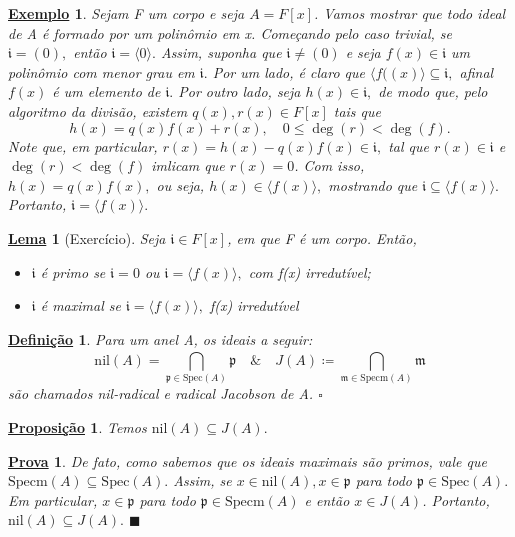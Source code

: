 \documentclass{article}
\newtheorem*{def*}{\underline{Defini\c c\~ao}}
\newtheorem*{lemma*}{\underline{Lema}}
\newtheorem*{prop*}{\underline{Proposi\c c\~ao}}
\newtheorem{example}{\underline{Exemplo}}
\newtheorem*{proof*}{\underline{Prova}}
\renewcommand\qedsymbol{$\blacksquare$}
\begin{document}
\begin{example}
  Sejam F um corpo e seja \(A = F[x]\). Vamos mostrar que todo ideal de A é formado por um polinômio em x.
Começando pelo caso trivial, se \(\mathfrak{i} = (0),\) então \(\mathfrak{i} = \langle 0 \rangle.\) Assim, suponha que \(\mathfrak{i}\neq (0)\)
e seja \(f(x)\in \mathfrak{i}\) um polinômio com menor grau em \(\mathfrak{i}.\) Por um lado, é claro que \(\langle f((x) \rangle\subseteq \mathfrak{i},\)
afinal \(f(x)\) é um elemento de \(\mathfrak{i}.\) Por outro lado, seja \(h(x)\in \mathfrak{i},\) de modo que, pelo algoritmo da divisão, existem \(q(x), r(x)\in F[x]\) tais que 
  \[
    h(x) = q(x)f(x) + r(x),\quad 0\leq \deg{(r)}<\deg{(f)}.
  \]
  Note que, em particular, \(r(x) = h(x)-q(x)f(x)\in \mathfrak{i},\) tal que \(r(x)\in \mathfrak{i}\) e \(\deg{(r)} <\deg{(f)}\) 
imlicam que \(r(x) = 0\). Com isso, \(h(x) = q(x)f(x),\) ou seja, \(h(x)\in \langle f(x) \rangle,\) mostrando que \(\mathfrak{i}\subseteq \langle f(x) \rangle.\)
Portanto, \(\mathfrak{i} = \langle f(x) \rangle.\)
\end{example}
\begin{lemma*}[Exercício]
  Seja \(\mathfrak{i}\in F[x]\), em que F é um corpo. Então, 
 \begin{itemize}
  \item[1)] \(\mathfrak{i}\) é primo se \(\mathfrak{i} = 0\) ou \(\mathfrak{i} = \langle f(x) \rangle,\) com f(x) irredutível;
  \item[2)] \(\mathfrak{i}\) é maximal se \(\mathfrak{i} = \langle f(x) \rangle,\) f(x) irredutível
 \end{itemize}
\end{lemma*}
\begin{def*}
  Para um anel A, os ideais a seguir:
  \[
    \mathrm{nil}(A) = \bigcap_{\mathfrak{p}\in \mathrm{Spec}(A)}^{}{\mathfrak{p}}\quad \& \quad J(A)\coloneqq \bigcap_{\mathfrak{m}\in \mathrm{Specm}(A)}^{}{\mathfrak{m}}
  \]
  são chamados nil-radical e radical Jacobson de A. \(\square\)
\end{def*}
\begin{prop*}
  Temos \(\mathrm{nil}(A) \subseteq{J(A)}.\)
\end{prop*}
\begin{proof*}
  De fato, como sabemos que os ideais maximais são primos, vale que \(\mathrm{Specm}(A)\subseteq{\mathrm{Spec}(A)}.\) Assim, se
  \(x\in \mathrm{nil}(A),x\in \mathfrak{p}\) para todo \(\mathfrak{p}\in \mathrm{Spec}(A).\) Em particular, \(x\in \mathfrak{p}\) para todo \(\mathfrak{p}\in \mathrm{Specm}(A)\)
  e então \(x\in J(A)\). Portanto, \(\mathrm{nil}(A) \subseteq{J(A)}.\) \qedsymbol
\end{proof*}
\end{document}
